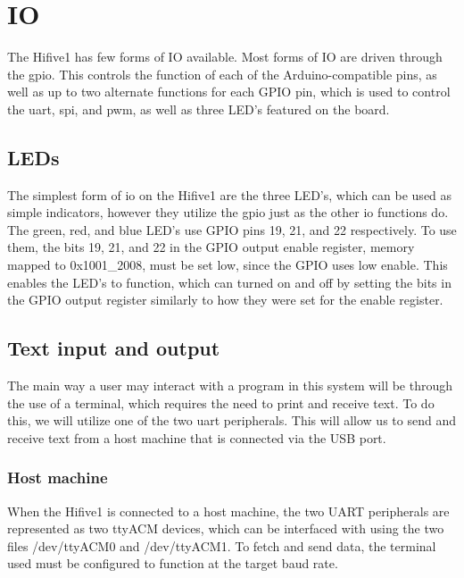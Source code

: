 \section{IO}
The Hifive1 has few forms of IO available. Most forms of IO are driven through the \ac{gpio}. This controls the function of each of the Arduino-compatible pins, as well as up to two alternate functions for each GPIO pin, which is used to control the \ac{uart}, \ac{spi}, and \ac{pwm}, as well as three LED's featured on the board. 
\subsection{LEDs}
The simplest form of \ac{io} on the Hifive1 are the three LED's, which can be used as simple indicators, however they utilize the \ac{gpio} just as the other \ac{io} functions do. The green, red, and blue LED's use GPIO pins 19, 21, and 22 respectively. To use them, the bits 19, 21, and 22 in the GPIO output enable register, memory mapped to 0x1001\_2008, must be set low, since the GPIO uses low enable. This enables the LED's to function, which can turned on and off by setting the bits in the GPIO output register similarly to how they were set for the enable register.
\subsection{Text input and output}
The main way a user may interact with a program in this system will be through the use of a terminal, which requires the need to print and receive text. To do this, we will utilize one of the two \ac{uart} peripherals. This will allow us to send and receive text from a host machine that is connected via the USB port.
\subsubsection{Host machine}
When the Hifive1 is connected to a host machine, the two UART peripherals are represented as two ttyACM devices, which can be interfaced with using the two files /dev/ttyACM0 and /dev/ttyACM1. To fetch and send data, the terminal used must be configured to function at the target baud rate.
